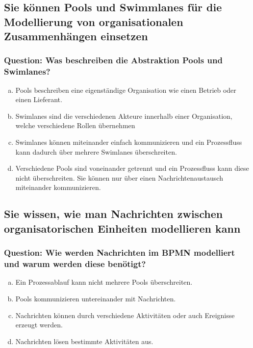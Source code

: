 \documentclass{article}
\begin{document}
\begin{adjustwidth}{2em}{2em}
\begin{adjustwidth}{2em}{2em}
			\subsection{Sie können Pools und Swimmlanes für die Modellierung von organisationalen Zusammenhängen einsetzen}
			\begin{adjustwidth}{1em}{}
				\subsubsection*{Question: Was beschreiben die Abstraktion Pools und Swimlanes?}
				\begin{adjustwidth}{1em}{}
					\begin{enumerate}[(a)]
						\item Pools beschreiben eine eigenständige Organisation wie einen Betrieb oder einen Lieferant.
						\item Swimlanes sind die verschiedenen Akteure innerhalb einer Organisation, welche verschiedene Rollen übernehmen
						\item Swimlanes können miteinander einfach kommunizieren und ein Prozessfluss kann dadurch über mehrere Swimlanes überschreiten.
						\item Verschiedene Pools sind voneinander getrennt und ein Prozessfluss kann diese nicht überschreiten. Sie können nur über einen Nachrichtenaustausch miteinander kommunizieren.
					\end{enumerate}
				\end{adjustwidth}
			\end{adjustwidth}
			\subsection{Sie wissen, wie man Nachrichten zwischen organisatorischen Einheiten modellieren kann}
			\begin{adjustwidth}{1em}{}
				\subsubsection*{Question: Wie werden Nachrichten im BPMN modelliert und warum werden diese benötigt?}
				\begin{adjustwidth}{1em}{}
					\begin{enumerate}[(a)]
						\item Ein Prozessablauf kann nicht mehrere Pools überschreiten.
						\item Pools kommunizieren untereinander mit Nachrichten.
						\item Nachrichten können durch verschiedene Aktivitäten oder auch Ereignisse erzeugt werden.
						\item Nachrichten lösen bestimmte Aktivitäten aus.
					\end{enumerate}
				\end{adjustwidth}
			\end{adjustwidth}			
		\end{adjustwidth}
		

\end{adjustwidth}
\end{document}
